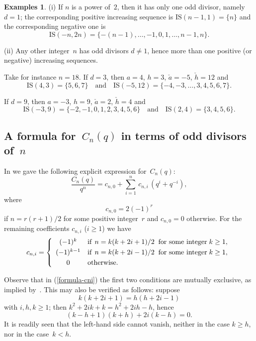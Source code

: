 \documentclass[11pt, a4paper]{amsart}
\theoremstyle{definition}
\newtheorem{exas}[theorem]{Examples}
\newcommand\IS{\mathrm{IS}}
\numberwithin{equation}{section}
\begin{document}
\begin{exas}
(i) If $n$ is a power of~$2$, then it has only one odd divisor, namely $d=1$; the corresponding positive increasing sequence
is $\IS(n-1,1) = \{n\}$ and the corresponding negative one is 
\[
\IS(-n,2n) = \{ -(n-1), \ldots, -1,0,1, \ldots, n-1,n\}.
\]

(ii) Any other integer~$n$ has odd divisors $d\neq 1$, hence more than one positive (or negative) increasing sequences.

Take for instance $n= 18$. If $d = 3$, then $a = 4$, $h=3$, $\check{a} = -5$, $\check{h} = 12$ and 
\[
\IS(4,3) = \{ 5,6,7\} \quad \text{and}\quad  
\IS(-5, 12) = \{-4, -3, \ldots, 3, 4, 5, 6, 7\} .
\]

If $d = 9$, then $a = -3$, $h=9$, $\check{a} = 2$, $\check{h} = 4$ and 
\[
\IS(-3,9) = \{ -2, -1, 0, 1, 2, 3, 4, 5,6 \} \quad \text{and}\quad  
\IS(2,4) = \{ 3, 4, 5, 6\} .
\]
\end{exas}


\subsection{A formula for~$C_n(q)$ in terms of odd divisors of~$n$}\label{ssec-Cnq}

In \cite[Th.~1.1]{KR3} we gave the following explicit expression for~$C_n(q)$:
\begin{equation*}\label{Cn-coeffi}
\frac{C_n(q)}{q^n} = c_{n,0}  + \sum_{i=1}^n \, c_{n,i} \, \left( q^{i} + q^{-i} \right) , 
\end{equation*}
where
\begin{equation}\label{formula-cn0}
c_{n,0} = 2 (-1)^r
\end{equation}
if $n = r(r+1)/2$ for some positive integer~$r$ and $c_{n,0} = 0$ otherwise. 
For the remaining coefficients $c_{n,i}$ ($i\geq 1$) we have
\begin{equation}\label{formula-cni}
c_{n,i} =
\left\{
\begin{array}{cl}
(-1)^k & \text{if}\;\, n = k(k+2i +1)/2 \;\; \text{for some integer}\; k  \geq 1, \\
\noalign{\smallskip}
(-1)^{k-1} & \text{if}\;\, n = k(k+2i -1)/2 \;\; \text{for some integer}\; k \geq 1, \\
\noalign{\smallskip}
0 & \text{otherwise.} 
\end{array}
\right.
\end{equation}

Observe that in (\ref{formula-cni}) the first two conditions are mutually exclusive, 
as implied by~\cite[Lemma~3.5 (ii)]{KR3}. This may also be verified as follows: suppose
\[
k(k+2i+1)=h(h+2i-1)
\] 
with $i,h,k\geq 1$; then $k^2+2ik+k=h^2+2ih-h$, hence 
\[
(k-h+1)(k+h)+2i(k-h)=0 .
\] 
It is readily seen that the left-hand side cannot vanish, neither in the case $k\geq h$, nor in the case~$k<h$.
\end{document}

